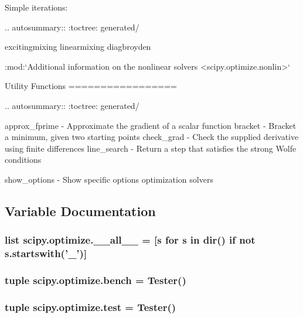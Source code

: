 \begin{DoxyVerb}
Simple iterations:

.. autosummary::
   :toctree: generated/

   excitingmixing
   linearmixing
   diagbroyden

:mod:`Additional information on the nonlinear solvers <scipy.optimize.nonlin>`

Utility Functions
=================

.. autosummary::
   :toctree: generated/

   approx_fprime - Approximate the gradient of a scalar function
   bracket - Bracket a minimum, given two starting points
   check_grad - Check the supplied derivative using finite differences
   line_search - Return a step that satisfies the strong Wolfe conditions

   show_options - Show specific options optimization solvers\end{DoxyVerb}
 

\subsection{Variable Documentation}
\hypertarget{namespacescipy_1_1optimize_a28f76c1100840cd45451a3dccb385259}{}
\subsubsection[{\+\_\+\+\_\+all\+\_\+\+\_\+}]{\setlength{\rightskip}{0pt plus 5cm}list scipy.\+optimize.\+\_\+\+\_\+all\+\_\+\+\_\+ = \mbox{[}{\bf s} for {\bf s} in dir() {\bf if} not s.\+startswith('\+\_\+')\mbox{]}}\label{namespacescipy_1_1optimize_a28f76c1100840cd45451a3dccb385259}
\hypertarget{namespacescipy_1_1optimize_a39d7d2798240bd9e2b90df38c71a3fa1}{}
\subsubsection[{bench}]{\setlength{\rightskip}{0pt plus 5cm}tuple scipy.\+optimize.\+bench = Tester()}\label{namespacescipy_1_1optimize_a39d7d2798240bd9e2b90df38c71a3fa1}
\hypertarget{namespacescipy_1_1optimize_a521c732bf624dd18d5c8507070e1a463}{}
\subsubsection[{test}]{\setlength{\rightskip}{0pt plus 5cm}tuple scipy.\+optimize.\+test = Tester()}\label{namespacescipy_1_1optimize_a521c732bf624dd18d5c8507070e1a463}

